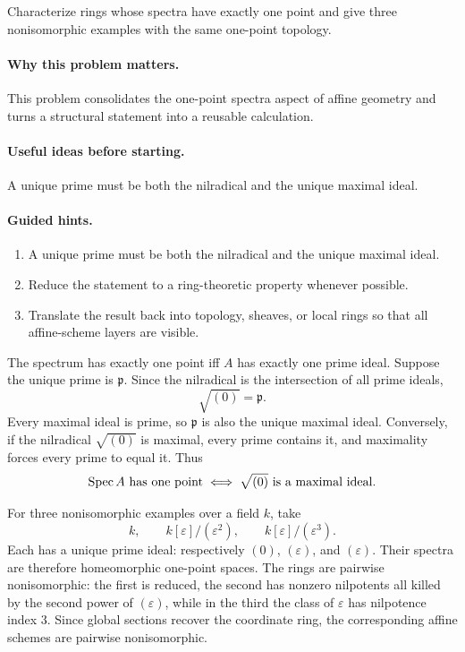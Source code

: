 \begin{problem}\label{prob:vi18-p10}
Characterize rings whose spectra have exactly one point and give three nonisomorphic examples with the same one-point topology.
\end{problem}

\ifdefined\FullProblemDossiers
\paragraph{Why this problem matters.}
This problem consolidates the one-point spectra aspect of affine geometry and turns a structural statement into a reusable calculation.

\paragraph{Useful ideas before starting.}
A unique prime must be both the nilradical and the unique maximal ideal.

\paragraph{Guided hints.}
\begin{enumerate}
\item A unique prime must be both the nilradical and the unique maximal ideal.
\item Reduce the statement to a ring-theoretic property whenever possible.
\item Translate the result back into topology, sheaves, or local rings so that all affine-scheme layers are visible.
\end{enumerate}

\begin{solution}
The spectrum has exactly one point iff $A$ has exactly one prime ideal. Suppose the unique prime is $\mathfrak p$. Since the nilradical is the intersection of all prime ideals,
\[
\sqrt{(0)}=\mathfrak p.
\]
Every maximal ideal is prime, so $\mathfrak p$ is also the unique maximal ideal. Conversely, if the nilradical $\sqrt{(0)}$ is maximal, every prime contains it, and maximality forces every prime to equal it. Thus
\[
\operatorname{Spec} A\text{ has one point}\iff\sqrt{(0)}\text{ is a maximal ideal}.
\]

For three nonisomorphic examples over a field $k$, take
\[
k,
\qquad
k[\varepsilon]/(\varepsilon^2),
\qquad
k[\varepsilon]/(\varepsilon^3).
\]
Each has a unique prime ideal: respectively $(0)$, $(\varepsilon)$, and $(\varepsilon)$. Their spectra are therefore homeomorphic one-point spaces. The rings are pairwise nonisomorphic: the first is reduced, the second has nonzero nilpotents all killed by the second power of $(\varepsilon)$, while in the third the class of $\varepsilon$ has nilpotence index $3$. Since global sections recover the coordinate ring, the corresponding affine schemes are pairwise nonisomorphic.
\end{solution}


